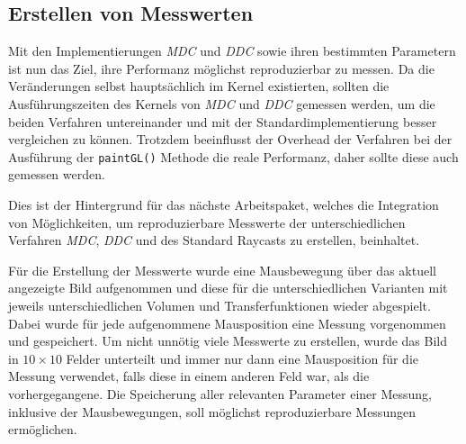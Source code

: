 \subsection{Erstellen von Messwerten}\label{sec::workpacks::evm}
Mit den Implementierungen \emph{MDC} und \emph{DDC} sowie ihren bestimmten Parametern ist nun das Ziel, ihre Performanz möglichst reproduzierbar zu messen. Da die Veränderungen selbst hauptsächlich im Kernel existierten, sollten die Ausführungszeiten des Kernels von \emph{MDC} und \emph{DDC} gemessen werden, um die beiden Verfahren untereinander und mit der Standardimplementierung besser vergleichen zu können.
Trotzdem beeinflusst der Overhead der Verfahren bei der Ausführung der \texttt{paintGL()} Methode die reale Performanz, daher sollte diese auch gemessen werden.

Dies ist der Hintergrund für das nächste Arbeitspaket, welches die Integration von Möglichkeiten, um reproduzierbare Messwerte der unterschiedlichen Verfahren \emph{MDC}, \emph{DDC} und des Standard Raycasts zu erstellen, beinhaltet.

Für die Erstellung der Messwerte wurde eine Mausbewegung über das aktuell angezeigte Bild aufgenommen und diese für die unterschiedlichen Varianten mit jeweils unterschiedlichen Volumen und Transferfunktionen wieder abgespielt.
Dabei wurde für jede aufgenommene Mausposition eine Messung vorgenommen und gespeichert.
Um nicht unnötig viele Messwerte zu erstellen, wurde das Bild in $10\times10$ Felder unterteilt und immer nur dann eine Mausposition für die Messung verwendet, falls diese in einem anderen Feld war, als die vorhergegangene.
Die Speicherung aller relevanten Parameter einer Messung, inklusive der Mausbewegungen, soll möglichst reproduzierbare Messungen ermöglichen.

